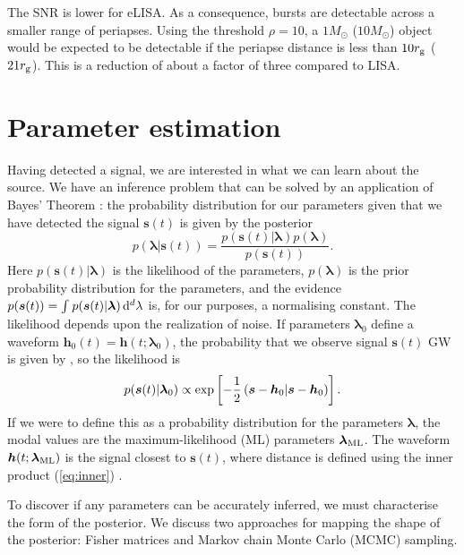 The SNR is lower for eLISA. As a consequence, bursts are detectable across a smaller range of periapses. Using the threshold $\rho = 10$, a $1 M_\odot$ ($10 M_\odot$) object would be expected to be detectable if the periapse distance is less than $10 r_\mathrm{g}$ ($21 r_\mathrm{g}$). This is a reduction of about a factor of three compared to LISA.

\section{Parameter estimation}\label{sec:Estimation}

Having detected a signal, we are interested in what we can learn about the source. We have an inference problem that can be solved by an application of Bayes' Theorem \citep[chapter 4]{Jaynes2003}: the probability distribution for our parameters given that we have detected the signal $\boldsymbol{s}(t)$ is given by the posterior
\begin{equation}
p(\boldsymbol{\lambda}|\boldsymbol{s}(t)) = \frac{p(\boldsymbol{s}(t)|\boldsymbol{\lambda})p(\boldsymbol{\lambda})}{p(\boldsymbol{s}(t))}.
\end{equation}
Here $p(\boldsymbol{s}(t)|\boldsymbol{\lambda})$ is the likelihood of the parameters, $p(\boldsymbol{\lambda})$ is the prior probability distribution for the parameters, and the evidence $p(\boldsymbol{s}(t)) = \int_{}^{}{p(\boldsymbol{s}(t)|\boldsymbol{\lambda})}\,\mathrm{d}{^d \lambda}$ is, for our purposes, a normalising constant. The likelihood depends upon the realization of noise. If parameters $\boldsymbol{\lambda}_0$ define a waveform $\boldsymbol{h}_0(t) = \boldsymbol{h}(t; \boldsymbol{\lambda}_0)$, the probability that we observe signal $\boldsymbol{s}(t)$ GW is given by , so the likelihood is
\begin{equation}
p(\boldsymbol{s}(t)|\boldsymbol{\lambda}_0) \propto \exp\left[-\frac{1}{2}\left({\boldsymbol{s}-\boldsymbol{h}_0}\middle|{\boldsymbol{s}-\boldsymbol{h}_0}\right)\right].
\label{eq:likelihood}
\end{equation}
If we were to define this as a probability distribution for the parameters $\boldsymbol{\lambda}$, the modal values are the maximum-likelihood (ML) parameters $\boldsymbol{\lambda}_\mathrm{ML}$. The waveform $\boldsymbol{h}(t; \boldsymbol{\lambda}_\mathrm{ML})$ is the signal closest to $\boldsymbol{s}(t)$, where distance is defined using the inner product (\ref{eq:inner}) \citep{Cutler1994}.

To discover if any parameters can be accurately inferred, we must characterise the form of the posterior. We discuss two approaches for mapping the shape of the posterior: Fisher matrices and Markov chain Monte Carlo (MCMC) sampling.

